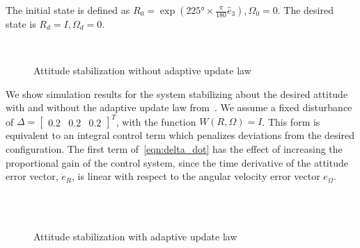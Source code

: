 \documentclass[fleqn]{IJCAS}  %
\begin{document}
\begin{multicols}{2}
The initial state is defined as \(R_0 =  \exp(\ang{225} \times \frac{\pi}{180} \hat{e}_3), \Omega_0 = 0\). 
The desired state is \( R_d = I,\Omega_d = 0\).
\begin{figure}[H] 
    \centering 
    ~
    \caption{Attitude stabilization without adaptive update law}
    \label{fig:con} 
\end{figure}
We show simulation results for the system stabilizing about the desired attitude with and without the adaptive update law from~.
We assume a fixed disturbance of \(\Delta = \begin{bmatrix} 0.2 & 0.2 & 0.2 \end{bmatrix}^T \), with the function \( W(R,\Omega) = I \).
This form is equivalent to an integral control term which penalizes deviations from the desired configuration.
The first term of~\cref{eqn:delta_dot} has the effect of increasing the proportional gain of the control system, since the time derivative of the attitude error vector, \( \dot{e}_{R} \), is linear with respect to the angular velocity error vector \( e_\Omega\).
\begin{figure}[H] 
	\centering 
    ~
    \\
    ~
	\caption{Attitude stabilization with adaptive update law}
	\label{fig:adapt} 
\end{figure}


\end{multicols}
\end{document}
